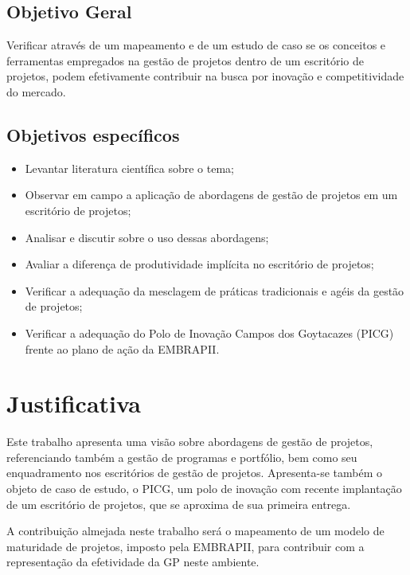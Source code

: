   \subsection{Objetivo Geral}

  Verificar através de um mapeamento e de um estudo de caso se os conceitos e ferramentas empregados na gestão de projetos dentro de um escritório de projetos, podem efetivamente contribuir na busca por inovação e competitividade do mercado.


  \subsection{Objetivos específicos}

  \begin{itemize}
    \item{Levantar literatura científica sobre o tema;}
    \item{Observar em campo a aplicação de abordagens de gestão de projetos em um escritório de projetos;}
    \item{Analisar e discutir sobre o uso dessas abordagens;}
    \item{Avaliar a diferença de produtividade implícita no escritório de projetos;}
    \item{Verificar a adequação da mesclagem de práticas tradicionais e agéis da gestão de projetos;}
    \item{Verificar a adequação do Polo de Inovação Campos dos Goytacazes (PICG) frente ao plano de ação da EMBRAPII.}
  \end{itemize}


\section{Justificativa}

  Este trabalho apresenta uma visão sobre abordagens de gestão de projetos, referenciando também a gestão de programas e portfólio, bem como seu enquadramento nos escritórios de gestão de projetos. Apresenta-se também o objeto de caso de estudo, o PICG, um polo de inovação com recente implantação de um escritório de projetos, que se aproxima de sua primeira entrega.

  A contribuição almejada neste trabalho será o mapeamento de um modelo de maturidade de projetos, imposto pela EMBRAPII, para contribuir com a representação da efetividade da GP neste ambiente.

